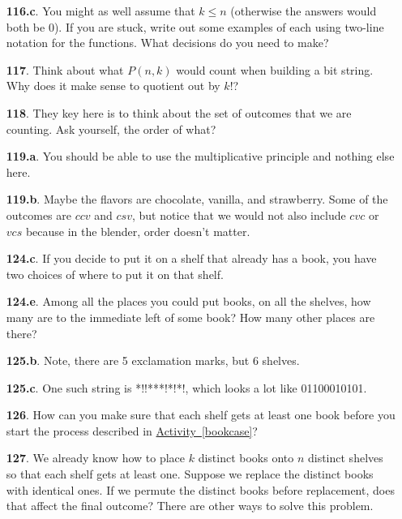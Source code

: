 \documentclass[10pt,]{book}
\theoremstyle{plain}
\theoremstyle{definition}
\theoremstyle{definition}
\theoremstyle{definition}
\numberwithin{equation}{chapter}
\begin{document}
\begin{itemize}[itemsep=1em]
\item[\textbf{116.c}.]\hypertarget{p-795}{}%
You might as well assume that \(k \le n\) (otherwise the answers would both be 0).  If you are stuck, write out some examples of each using two-line notation for the functions.  What decisions do you need to make?%

\item[\textbf{117}.]\hypertarget{p-797}{}%
Think about what \(P(n,k)\) would count when building a bit string.  Why does it make sense to quotient out by \(k!\)?%

\item[\textbf{118}.]\hypertarget{p-799}{}%
They key here is to think about the set of outcomes that we are counting.  Ask yourself, the order of what?%

\item[\textbf{119.a}.]\hypertarget{p-802}{}%
You should be able to use the multiplicative principle and nothing else here.%

\item[\textbf{119.b}.]\hypertarget{p-804}{}%
Maybe the flavors are chocolate, vanilla, and strawberry.  Some of the outcomes are \(ccv\) and \(csv\), but notice that we would not also include \(cvc\) or \(vcs\) because in the blender, order doesn't matter.%

\item[\textbf{124.c}.]\hypertarget{p-831}{}%
If you decide to put it on a shelf that already has a book, you have two choices of where to put it on that shelf.%

\item[\textbf{124.e}.]\hypertarget{p-836}{}%
Among all the places you could put books, on all the shelves, how many are to the immediate left of some book? How many other places are there?%

\item[\textbf{125.b}.]\hypertarget{p-845}{}%
Note, there are 5 exclamation marks, but 6 shelves.%

\item[\textbf{125.c}.]\hypertarget{p-847}{}%
One such string is *!!***!*!*!, which looks a lot like 01100010101.%

\item[\textbf{126}.]\hypertarget{p-856}{}%
How can you make sure that each shelf gets at least one book before you start the process described in \hyperref[bookcase]{Activity~\ref{bookcase}}?%

\item[\textbf{127}.]\hypertarget{p-860}{}%
We already know how to place \(k\) distinct books onto \(n\) distinct shelves so that each shelf gets at least one. Suppose we replace the distinct books with identical ones. If we permute the distinct books before replacement, does that affect the final outcome? There are other ways to solve this problem.%


\end{itemize}
\end{document}
